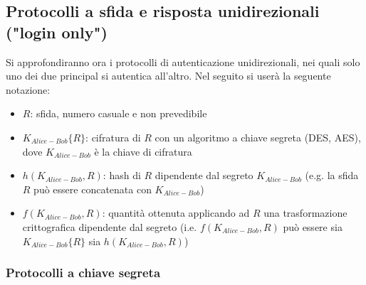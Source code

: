 \subsection{Protocolli a sfida e risposta unidirezionali ("login only")}
Si approfondiranno ora i protocolli di autenticazione unidirezionali, nei quali solo uno dei due principal si autentica all'altro. Nel seguito si userà la seguente notazione:
\begin{itemize}
	\item $R$: sfida, numero casuale e non prevedibile
	\item $K_{Alice-Bob}\lbrace R\rbrace$: cifratura di $R$ con un algoritmo a chiave segreta (DES, AES), dove $K_{Alice-Bob}$ è la chiave di cifratura
	\item $h(K_{Alice-Bob}, R)$: hash di $R$ dipendente dal segreto $K_{Alice-Bob}$ (e.g. la sfida $R$ può essere concatenata con $K_{Alice-Bob}$)
	\item $f(K_{Alice-Bob}, R)$: quantità ottenuta applicando ad $R$ una trasformazione crittografica dipendente dal segreto (i.e. $f(K_{Alice-Bob}, R)$ può essere sia $K_{Alice-Bob}\lbrace R\rbrace$ sia $h(K_{Alice-Bob}, R)$)
\end{itemize}
\subsubsection{Protocolli a chiave segreta}
